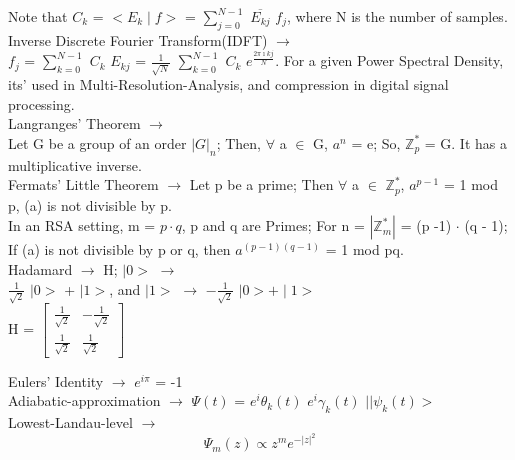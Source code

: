 \documentclass[a4paper, 10pt, onepage]{elegantbook}
\begin{document}
{Note that $C_k$ = $<E_k \mid f>$ = $\sum_{j = 0}^{N-1}$ $\overline {E_{kj}}$ $f_{j}$, where N is the  number of samples.  \\

Inverse Discrete Fourier Transform(IDFT) $\rightarrow$  \\
 
$f_j$ = $\sum_{k = 0}^{N - 1}$ $C_k$ $E_{kj}$ = $\frac{1}{\sqrt N}$ $\sum_{k = 0}^{N - 1}$ $C_k$ $e^{\frac{2 \pi \imath {kj}}{N}}$. For a given Power Spectral Density, its' used in Multi-Resolution-Analysis, and compression in digital signal processing. \\

Langranges' Theorem $\rightarrow$  \\ 

Let G be a group of an order $|G|_n$; Then, $\forall$ a $\in$ G, $a^n$ = e; 
So, $\mathbb Z_p^*$ = G. It has a multiplicative inverse.  \\

Fermats' Little Theorem $\rightarrow$ Let p be a prime; Then $\forall$ a $\in$ $\mathbb Z_p^*$, $a^{p - 1}$ = 1 mod p, (a) is not divisible by p. \\

In an RSA setting, m = $p \cdot q$, p and q are Primes; For n = $|\mathbb Z_m^*|$ = (p -1) $\cdot$ (q - 1); 
If (a) is not divisible by p or q, then $a^{(p - 1)(q - 1)}$ = 1 mod {pq}. \\

Hadamard $\longrightarrow$ H; $ \mid 0>$ $\rightarrow$  \\

$\frac{1}{\sqrt 2}$ $ \mid 0>$ + $\mid 1>$, and $ \mid 1>$ $\rightarrow$ $ - \frac{1}{\sqrt 2}$ $ \mid 0> + \mid 1>$  \\

H =
$
\begin{bmatrix}
\frac{1}{\sqrt 2} &  - \frac{1}{\sqrt 2} \\
\frac{1}{\sqrt 2} &    \frac{1}{\sqrt 2}
\end{bmatrix}
$

Eulers' Identity $\rightarrow$ $e^{i \pi}$ = -1  \\

Adiabatic-approximation $\rightarrow$ $\Psi(t)$ = $e^i {\theta_k (t)}$ $e^i {\gamma_k (t)}$ $|\mid  \psi_k(t)>$  \\

Lowest-Landau-level $\rightarrow$  \\
\begin{equation}
\Psi_m(z) \propto z^m e^{-|z|^2}
\end{equation}

}
\end{document}
